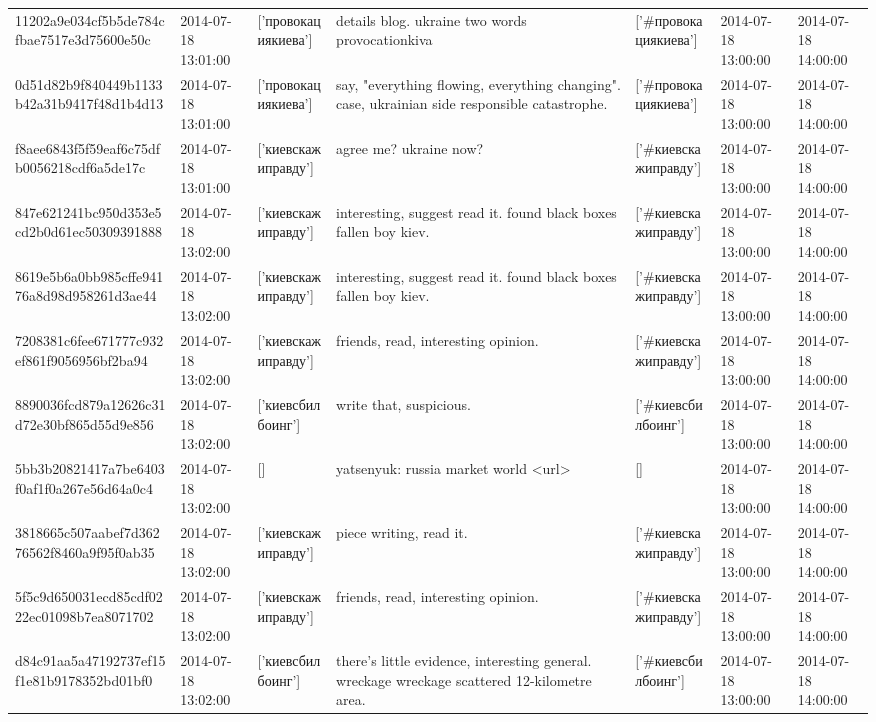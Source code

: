 \begin{tabular}{lllllll}
11202a9e034cf5b5de784cfbae7517e3d75600e50c & 2014-07-18 13:01:00 & ['провокациякиева'] & details blog. ukraine two words provocationkiva & ['#провокациякиева'] & 2014-07-18 13:00:00 & 2014-07-18 14:00:00 \\
0d51d82b9f840449b1133b42a31b9417f48d1b4d13 & 2014-07-18 13:01:00 & ['провокациякиева'] & say, "everything flowing, everything changing". case, ukrainian side responsible catastrophe. & ['#провокациякиева'] & 2014-07-18 13:00:00 & 2014-07-18 14:00:00 \\
f8aee6843f5f59eaf6c75dfb0056218cdf6a5de17c & 2014-07-18 13:01:00 & ['киевскажиправду'] & agree me? ukraine now? & ['#киевскажиправду'] & 2014-07-18 13:00:00 & 2014-07-18 14:00:00 \\
847e621241bc950d353e5cd2b0d61ec50309391888 & 2014-07-18 13:02:00 & ['киевскажиправду'] & interesting, suggest read it. found black boxes fallen boy kiev. & ['#киевскажиправду'] & 2014-07-18 13:00:00 & 2014-07-18 14:00:00 \\
8619e5b6a0bb985cffe94176a8d98d958261d3ae44 & 2014-07-18 13:02:00 & ['киевскажиправду'] & interesting, suggest read it. found black boxes fallen boy kiev. & ['#киевскажиправду'] & 2014-07-18 13:00:00 & 2014-07-18 14:00:00 \\
7208381c6fee671777c932ef861f9056956bf2ba94 & 2014-07-18 13:02:00 & ['киевскажиправду'] & friends, read, interesting opinion. & ['#киевскажиправду'] & 2014-07-18 13:00:00 & 2014-07-18 14:00:00 \\
8890036fcd879a12626c31d72e30bf865d55d9e856 & 2014-07-18 13:02:00 & ['киевсбилбоинг'] & write that, suspicious. & ['#киевсбилбоинг'] & 2014-07-18 13:00:00 & 2014-07-18 14:00:00 \\
5bb3b20821417a7be6403f0af1f0a267e56d64a0c4 & 2014-07-18 13:02:00 & [] & yatsenyuk: russia market world <url> & [] & 2014-07-18 13:00:00 & 2014-07-18 14:00:00 \\
3818665c507aabef7d36276562f8460a9f95f0ab35 & 2014-07-18 13:02:00 & ['киевскажиправду'] & piece writing, read it. & ['#киевскажиправду'] & 2014-07-18 13:00:00 & 2014-07-18 14:00:00 \\
5f5c9d650031ecd85cdf0222ec01098b7ea8071702 & 2014-07-18 13:02:00 & ['киевскажиправду'] & friends, read, interesting opinion. & ['#киевскажиправду'] & 2014-07-18 13:00:00 & 2014-07-18 14:00:00 \\
d84c91aa5a47192737ef15f1e81b9178352bd01bf0 & 2014-07-18 13:02:00 & ['киевсбилбоинг'] & there's little evidence, interesting general. wreckage wreckage scattered 12-kilometre area. & ['#киевсбилбоинг'] & 2014-07-18 13:00:00 & 2014-07-18 14:00:00 \\

\end{tabular}
